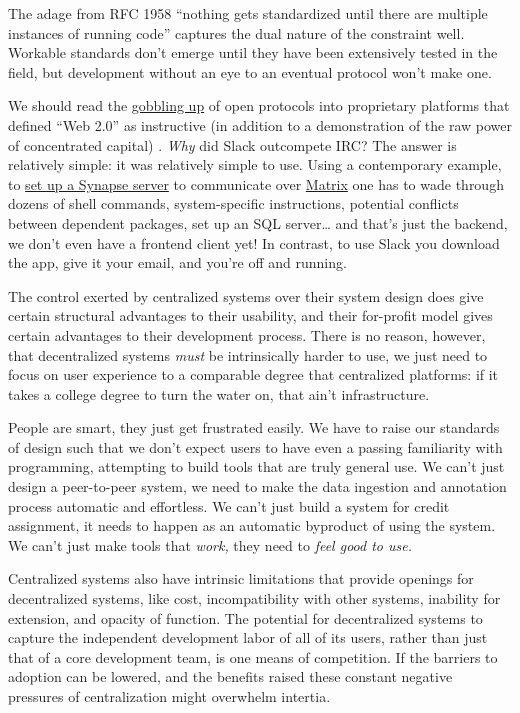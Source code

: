 \documentclass[notoc]{tufte-book}
\begin{document}
The adage from RFC 1958 ``nothing gets standardized until there are
multiple instances of running code'' \citep{carpenterRFC1958Architectural1996}  captures the dual nature of the
constraint well. Workable standards don't emerge until they have been
extensively tested in the field, but development without an eye to an
eventual protocol won't make one.

We should read the
\href{https://en.wikipedia.org/wiki/Embrace,_extend,_and_extinguish}{gobbling
up} of open protocols into proprietary platforms that defined ``Web
2.0'' as instructive (in addition to a demonstration of the raw power of
concentrated capital) \citep{markoffTomorrowWorldWide1996} .
\emph{Why} did Slack outcompete IRC? The answer is relatively simple: it
was relatively simple to use. Using a contemporary example, to
\href{https://matrix-org.github.io/synapse/latest/setup/installation.html}{set
up a Synapse server} to communicate over
\href{https://matrix.org/docs/spec/}{Matrix} one has to wade through
dozens of shell commands, system-specific instructions, potential
conflicts between dependent packages, set up an SQL server\ldots{} and
that's just the backend, we don't even have a frontend client yet! In
contrast, to use Slack you download the app, give it your email, and
you're off and running.

The control exerted by centralized systems over their system design does
give certain structural advantages to their usability, and their
for-profit model gives certain advantages to their development process.
There is no reason, however, that decentralized systems \emph{must} be
intrinsically harder to use, we just need to focus on user experience to
a comparable degree that centralized platforms: if it takes a college
degree to turn the water on, that ain't infrastructure.

People are smart, they just get frustrated easily. We have to raise our
standards of design such that we don't expect users to have even a
passing familiarity with programming, attempting to build tools that are
truly general use. We can't just design a peer-to-peer system, we need
to make the data ingestion and annotation process automatic and
effortless. We can't just build a system for credit assignment, it needs
to happen as an automatic byproduct of using the system. We can't just
make tools that \emph{work,} they need to \emph{feel good to use.}

Centralized systems also have intrinsic limitations that provide
openings for decentralized systems, like cost, incompatibility with
other systems, inability for extension, and opacity of function. The
potential for decentralized systems to capture the independent
development labor of all of its users, rather than just that of a core
development team, is one means of competition. If the barriers to
adoption can be lowered, and the benefits raised these constant negative
pressures of centralization might overwhelm intertia.
\end{document}
